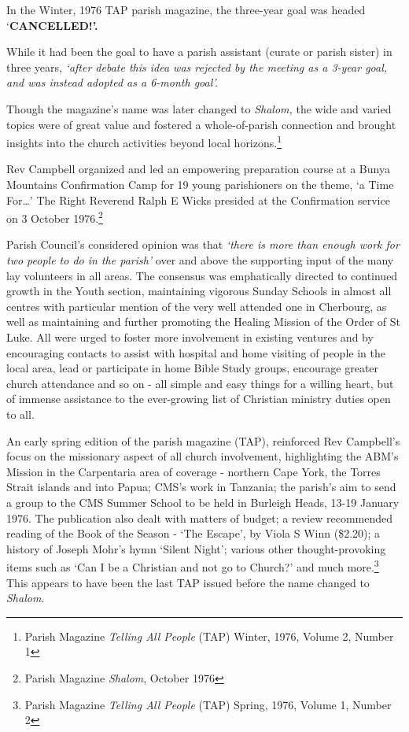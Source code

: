 In the Winter, 1976 TAP parish magazine, the three-year goal was headed `\textbf{CANCELLED!'.}

While it had been the goal to have a parish assistant (curate or parish sister) in three years, \emph{`after debate this idea was rejected by the meeting as a 3-year goal, and was instead adopted as a 6-month goal'.}

Though the magazine's name was later changed to \emph{Shalom,} the wide and varied topics were of great value and fostered a whole-of-parish connection and brought insights into the church activities beyond local horizons.\footnote{Parish Magazine \emph{Telling All People} (TAP) Winter, 1976, Volume 2, Number 1}

Rev Campbell organized and led an empowering preparation course at a Bunya Mountains Confirmation Camp for 19 young parishioners on the theme, `a Time For\ldots' The Right Reverend Ralph E Wicks presided at the Confirmation service on 3 October 1976.\footnote{Parish Magazine \emph{Shalom}, October 1976}

Parish Council's considered opinion was that \emph{`there is more than enough work for two people to do in the parish'} over and above the supporting input of the many lay volunteers in all areas. The consensus was emphatically directed to continued growth in the Youth section, maintaining vigorous Sunday Schools in almost all centres with particular mention of the very well attended one in Cherbourg, as well as maintaining and further promoting the Healing Mission of the Order of St Luke. All were urged to foster more involvement in existing ventures and by encouraging contacts to assist with hospital and home visiting of people in the local area, lead or participate in home Bible Study groups, encourage greater church attendance and so on - all simple and easy things for a willing heart, but of immense assistance to the ever-growing list of Christian ministry duties open to all.

An early spring edition of the parish magazine (TAP), reinforced Rev Campbell's focus on the missionary aspect of all church involvement, highlighting the ABM's Mission in the Carpentaria area of coverage - northern Cape York, the Torres Strait islands and into Papua; CMS's work in Tanzania; the parish's aim to send a group to the CMS Summer School to be held in Burleigh Heads, 13-19 January 1976. The publication also dealt with matters of budget; a review recommended reading of the Book of the Season - `The Escape', by Viola S Winn (\$2.20); a history of Joseph Mohr's hymn `Silent Night'; various other thought-provoking items such as `Can I be a Christian and not go to Church?' and much more.\footnote{Parish Magazine \emph{Telling All People} (TAP) Spring, 1976, Volume 1, Number 2} This appears to have been the last TAP issued before the name changed to \emph{Shalom}.

